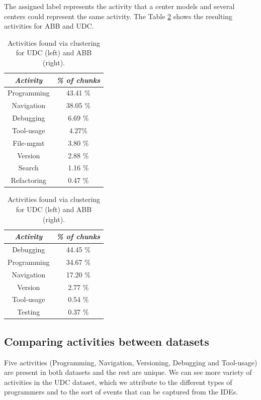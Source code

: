 \documentclass[conference]{IEEEtran}
\begin{document}
The assigned label represents the activity that a center models and several centers could represent the same activity. The Table \ref{tbl:activities} shows the resulting activities for ABB and UDC.

\begin{table}
	\caption{Activities found via clustering for UDC (left) and ABB (right).}
	\label{tbl:activities}
	\centering
	\begin{tabular}{| c | c |}
		\hline 
		\emph{Activity} & \emph{\% of chunks}\\  
		\hline 
		\hline
		Programming & 43.41 \% \\
		\hline
		Navigation & 38.05 \%\\
		\hline
		Debugging & 6.69 \% \\
		\hline	
		Tool-usage & 4.27\% \\
		\hline
		File-mgmt & 3.80 \% \\
		\hline 		
		Version & 2.88 \%\\
		\hline
		Search & 1.16 \% \\
		\hline
		Refactoring & 0.47 \% \\
		\hline
		
	\end{tabular}
	\quad
	\begin{tabular}{| c | c |}
		\hline 
		\emph{Activity} & \emph{\% of chunks}\\  
		\hline 
		\hline 
		Debugging & 44.45 \% \\
		\hline
		Programming & 34.67 \% \\
		\hline
		Navigation & 17.20 \%\\
		\hline
		Version & 2.77 \%\\
		\hline
		Tool-usage & 0.54 \% \\
		\hline
		Testing & 0.37	 \% \\
		\hline
	\end{tabular}
\end{table}

\subsection{Comparing activities between datasets}

Five activities (Programming, Navigation, Versioning, Debugging and Tool-usage) are present in both datasets and the rest are unique. We can see more variety of activities in the UDC dataset, which we attribute to the different types of programmers and to the sort of events that can be captured from the IDEs.
\end{document}
